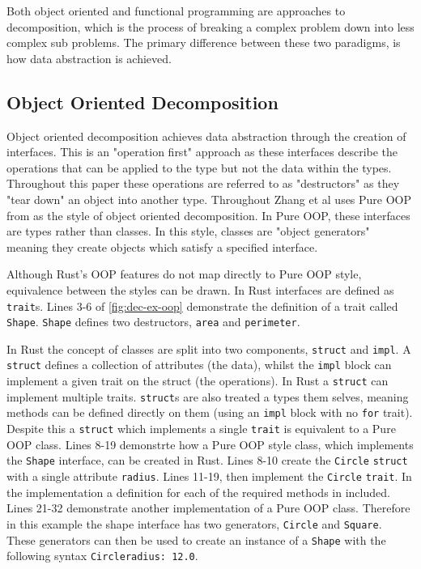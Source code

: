 \documentclass[ oneside,%
                    author={James Elgar},
                    degree={MEng},
                     title={Bidirectional transformer between functional and \\ object-oriented programming in Rust},
                  subtitle={}]{dissertation}
\newcommand{\weixin}{Zhang et al }
\newcommand{\rust}[1]{\texttt{#1}}
\begin{document}
Both object oriented and functional programming are approaches to decomposition, which is the process of breaking a complex problem down into less complex sub problems. The primary difference between these two paradigms, is how data abstraction is achieved.

\subsection{Object Oriented Decomposition}

Object oriented decomposition achieves data abstraction through the creation of interfaces. This is an "operation first" \cite{food} approach as these interfaces describe the operations that can be applied to the type but not the data within the types.
Throughout this paper these operations are referred to as "destructors" as they "tear down" an object into another type.
Throughout \cite{food} \weixin uses Pure OOP from \cite{cook} as the style of object oriented decomposition. In Pure OOP, these interfaces are types rather than classes.
In this style, classes are "object generators" \cite{food} meaning they create objects which satisfy a specified interface.

Although Rust's OOP features do not map directly to Pure OOP style, equivalence between the styles can be drawn. In Rust interfaces are defined as \rust{trait}s. Lines 3-6 of \autoref{fig:dec-ex-oop} demonstrate the definition of a trait called \rust{Shape}. \rust{Shape} defines two destructors, \rust{area} and \rust{perimeter}. 

In Rust the concept of classes are split into two components, \rust{struct} and \rust{impl}. A \rust{struct} defines a collection of attributes (the data), whilst the \rust{impl} block can implement a given trait on the struct (the operations). In Rust a \rust{struct} can implement multiple traits. \rust{struct}s are also treated a types them selves, meaning methods can be defined directly on them (using an \rust{impl} block with no \rust{for} trait). Despite this a \rust{struct} which implements a single \rust{trait} is equivalent to a Pure OOP class. 
Lines 8-19 demonstrte how a Pure OOP style class, which implements the \rust{Shape} interface, can be created in Rust. 
Lines 8-10 create the \rust{Circle} \rust{struct} with a single attribute \rust{radius}. Lines 11-19, then implement the \rust{Circle} \rust{trait}. In the implementation a definition for each of the required methods in included. 
Lines 21-32 demonstrate another implementation of a Pure OOP class. Therefore in this example the shape interface has two generators, \rust{Circle} and \rust{Square}. These generators can then be used to create an instance of a \rust{Shape} with the following syntax \rust{Circle{radius: 12.0}}.
\end{document}
